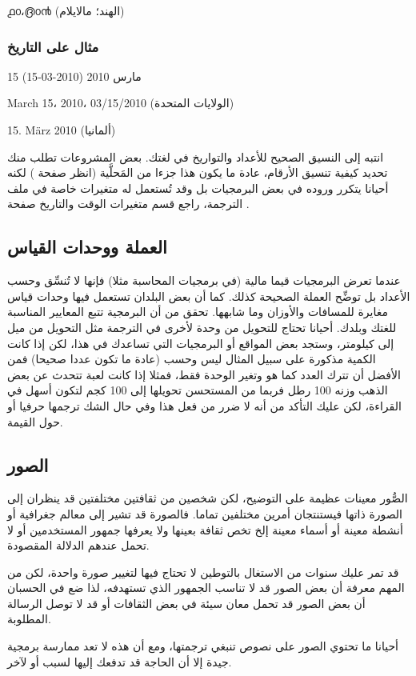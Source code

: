 ൧൦،൫൦൯ (الهند؛ مالايلام)

\subsubsection{مثال على التاريخ}
15 مارس 2010 (2010-03-15)

March 15، 2010، 03/15/2010 (الولايات المتحدة)

15. März 2010 (ألمانيا)

انتبه إلى النسيق الصحيح للأعداد والتواريخ في لغتك. بعض المشروعات تطلب
منك تحديد كيفية تنسيق الأرقام، عادة ما يكون هذا جزءا من المَحلَّية
(انظر صفحة ) لكنه أحيانا يتكرر وروده في بعض
البرمجيات بل وقد تُستعمل له متغيرات خاصة في ملف الترجمة، راجع قسم
متغيرات الوقت والتاريخ صفحة .

\subsection{العملة ووحدات القياس}
عندما تعرض البرمجيات قيما مالية (في برمجيات المحاسبة مثلا) فإنها لا
تُنسِّق وحسب الأعداد بل توضِّح العملة الصحيحة كذلك. كما أن بعض البلدان
تستعمل فيها وحدات قياس مغايرة للمسافات والأوزان وما شابهها. تحقق من أن
البرمجية تتبع المعايير المناسبة للغتك وبلدك. أحيانا تحتاج للتحويل من
وحدة لأخرى في الترجمة مثل التحويل من ميل إلى كيلومتر، وستجد بعض المواقع
أو البرمجيات التي تساعدك في هذا، لكن إذا كانت الكمية مذكورة على سبيل
المثال ليس وحسب (عادة ما تكون عددا صحيحا) فمن الأفضل أن تترك العدد كما
هو وتغير الوحدة فقط، فمثلا إذا كانت لعبة تتحدث عن بعض الذهب وزنه 100
رطل فربما من المستحسن تحويلها إلى 100 كجم لتكون أسهل في القراءة، لكن
عليك التأكد من أنه لا ضرر من فعل هذا وفي حال الشك ترجمها حرفيا أو حول
القيمة.

\subsection{الصور}
الصُّور معينات عظيمة على التوضيح، لكن شخصين من ثقافتين مختلفتين قد
ينظران إلى الصورة ذاتها فيستنتجان أمرين مختلفين تماما. فالصورة قد تشير
إلى معالم جغرافية أو أنشطة معينة أو أسماء معينة إلخ تخص ثقافة بعينها
ولا يعرفها جمهور المستخدمين أو لا تحمل عندهم الدلالة المقصودة.

قد تمر عليك سنوات من الاستغال بالتوطين لا تحتاج فيها لتغيير صورة واحدة،
لكن من المهم معرفة أن بعض الصور قد لا تناسب الجمهور الذي تستهدفه، لذا
ضع في الحسبان أن بعض الصور قد تحمل معان سيئة في بعض الثقافات أو قد لا
توصل الرسالة المطلوبة.

أحيانا ما تحتوي الصور على نصوص تنبغي ترجمتها، ومع أن هذه لا تعد ممارسة
برمجية جيدة إلا أن الحاجة قد تدفعك إليها لسبب أو لآخر.

